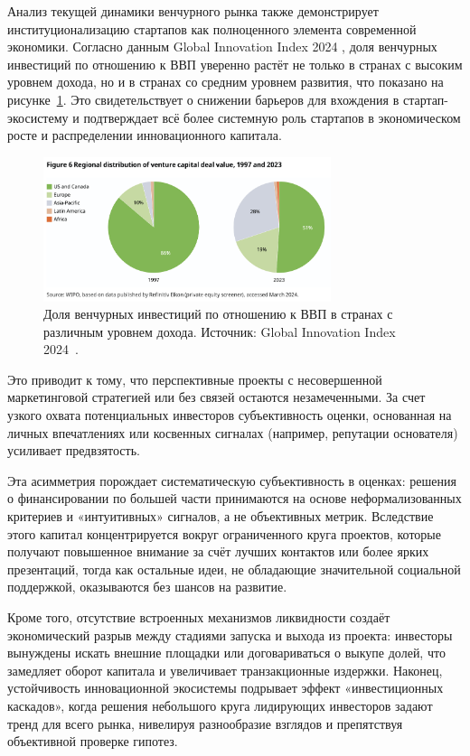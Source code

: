 \documentclass[
    14pt,
    specialist,
    candidate, %
    subf, %
    href,
    dotsinheaders=false
]{disser}
\begin{document}
Анализ текущей динамики венчурного рынка также демонстрирует институционализацию стартапов как полноценного элемента современной экономики. Согласно данным Global Innovation Index 2024 \cite{gii2024}, доля венчурных инвестиций по отношению к ВВП уверенно растёт не только в странах с высоким уровнем дохода, но и в странах со средним уровнем развития, что показано на рисунке~\ref{fig:vc-gdp-share}. Это свидетельствует о снижении барьеров для вхождения в стартап-экосистему и подтверждает всё более системную роль стартапов в экономическом росте и распределении инновационного капитала.

\begin{figure}[h]
  \centering
  \includegraphics[width=0.75\textwidth]{assets/vc-gdp-share.png}
  \caption{Доля венчурных инвестиций по отношению к ВВП в странах с различным уровнем дохода. Источник: Global Innovation Index 2024~\cite{gii2024}.}
  \label{fig:vc-gdp-share}
\end{figure}

Это приводит к тому, что перспективные проекты с несовершенной маркетинговой стратегией или без связей остаются незамеченными. За счет узкого охвата потенциальных инвесторов субъективность оценки, основанная на личных впечатлениях или косвенных сигналах (например, репутации основателя) усиливает предвзятость.

Эта асимметрия порождает систематическую субъективность в оценках: решения о финансировании по большей части принимаются на основе неформализованных критериев и «интуитивных» сигналов, а не объективных метрик. Вследствие этого капитал концентрируется вокруг ограниченного круга проектов, которые получают повышенное внимание за счёт лучших контактов или более ярких презентаций, тогда как остальные идеи, не обладающие значительной социальной поддержкой, оказываются без шансов на развитие.

Кроме того, отсутствие встроенных механизмов ликвидности создаёт экономический разрыв между стадиями запуска и выхода из проекта: инвесторы вынуждены искать внешние площадки или договариваться о выкупе долей, что замедляет оборот капитала и увеличивает транзакционные издержки. Наконец, устойчивость инновационной экосистемы подрывает эффект «инвестиционных каскадов», когда решения небольшого круга лидирующих инвесторов задают тренд для всего рынка, нивелируя разнообразие взглядов и препятствуя объективной проверке гипотез.
\end{document}
